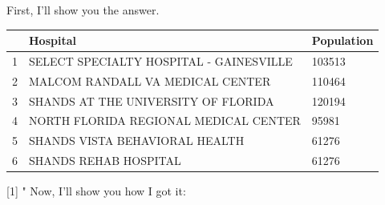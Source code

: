 \documentclass{article}
\begin{document}
 First, I'll show you the answer.

\begin{table}[ht]
\centering
\begin{tabular}{rll}
  \hline
 & Hospital & Population \\ 
  \hline
1 & SELECT SPECIALTY HOSPITAL - GAINESVILLE & 103513 \\ 
  2 & MALCOM RANDALL VA MEDICAL CENTER & 110464 \\ 
  3 & SHANDS AT THE UNIVERSITY OF FLORIDA & 120194 \\ 
  4 & NORTH FLORIDA REGIONAL MEDICAL CENTER & 95981 \\ 
  5 & SHANDS VISTA BEHAVIORAL HEALTH & 61276 \\ 
  6 & SHANDS REHAB HOSPITAL & 61276 \\ 
   \hline
\end{tabular}
\end{table}
[1] "%
Now, I'll show you how I got it: \\
 
\end{document}
